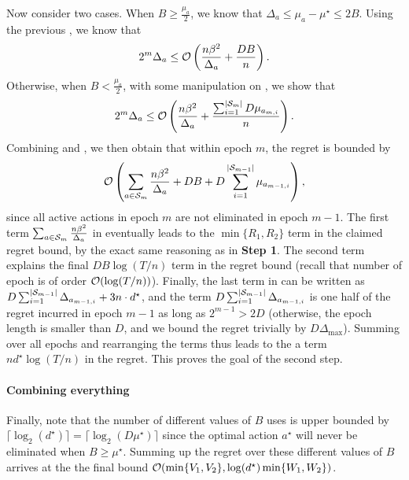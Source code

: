 Now consider two cases. When $B\geq \frac{\mu_a}{2}$, we know that $\Delta_a\leq \mu_a - \mu^\star\leq 2B$. Using the previous , we know that
\begin{align}\label{eqn:small-loss-1}
    2^m\Delta_a\leq \mathcal{O}\left(\frac{n\beta^2}{\Delta_a}+\frac{DB}{n}\right).
\end{align}
Otherwise, when $B < \frac{\mu_a}{2}$, with some manipulation on , we show that
\begin{align}\label{eqn:small-loss-2}
    2^m\Delta_a\leq \mathcal{O}\left(\frac{n\beta^2}{\Delta_a}+\frac{\sum_{i=1}^{|{\mathcal{S}}_m|}D\mu_{a_{m,i}}}{n}\right).
\end{align}
Combining  and , we then obtain that within epoch $m$, the regret is bounded by
\begin{align}\label{eqn:small-loss-3}
\mathcal{O}\left(\sum_{a\in{\mathcal{S}}_m}\frac{n\beta^2}{\Delta_a}+DB+D\sum_{i=1}^{|{\mathcal{S}}_{m-1}|}\mu_{a_{m-1,i}}\right),
\end{align} 
since all active actions in epoch $m$ are not eliminated in epoch $m-1$.
The first term $\sum_{a\in{\mathcal{S}}_m}\frac{n\beta^2}{\Delta_a}$ in  eventually leads to the $\min\{R_1,R_2\}$ term in the claimed regret bound, by the exact same reasoning as in \textbf{Step 1}.
The second term explains the final $DB\log(T/n)$ term in the regret bound (recall that number of epoch is of order $\mathcal{O}(\log(T/n))$).
Finally, the last term in  can be written as
$D\sum_{i=1}^{|{\mathcal{S}}_{m-1}|} \Delta_{a_{m-1,i}} + 3n\cdot d^\star$,
and the term $D\sum_{i=1}^{|{\mathcal{S}}_{m-1}|} \Delta_{a_{m-1,i}}$ is one half of the regret incurred in epoch $m-1$ as long as $2^{m-1}>2D$ (otherwise, the epoch length is smaller than $D$, and we bound the regret trivially by $D\Delta_{\max}$).
Summing over all epochs and rearranging the terms thus leads to the a term $nd^\star\log(T/n)$ in the regret.
This proves the goal of the second step.

\paragraph{Combining everything} 
Finally, note that the number of different values of $B$  uses is upper bounded by $\lceil\log_2(d^\star)\rceil=\lceil\log_2(D\mu^\star)\rceil$ since the optimal action $a^\star$ will never be eliminated when $B\geq \mu^\star$. Summing up the regret over these different values of $B$ arrives at the the final bound $\mathcal{O}(\min\{V_1,V_2\},\log(d^\star)\min\{W_1,W_2\})$.